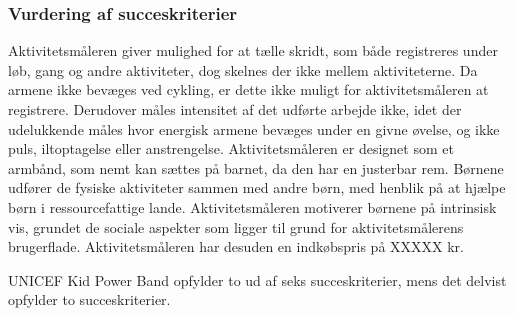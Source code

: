 \subsubsection{Vurdering af succeskriterier}
Aktivitetsmåleren giver mulighed for at tælle skridt, som både registreres under løb, gang og andre aktiviteter, dog skelnes der ikke mellem aktiviteterne. Da armene ikke bevæges ved cykling, er dette ikke muligt for aktivitetsmåleren at registrere. Derudover måles intensitet af det udførte arbejde ikke, idet der udelukkende måles hvor energisk armene bevæges under en givne øvelse, og ikke puls, iltoptagelse eller anstrengelse. Aktivitetsmåleren er designet som et armbånd, som nemt kan sættes på barnet, da den har en justerbar rem. \citep{PowerManual2015} \newline
Børnene udfører de fysiske aktiviteter sammen med andre børn, med henblik på at hjælpe børn i ressourcefattige lande. Aktivitetsmåleren motiverer børnene på intrinsisk vis, grundet de sociale aspekter som ligger til grund for aktivitetsmålerens brugerflade. \newline
Aktivitetsmåleren har desuden en indkøbspris på XXXXX kr.
\citep{PowerAbout2015} 

UNICEF Kid Power Band opfylder to ud af seks succeskriterier, mens det delvist opfylder to succeskriterier.

